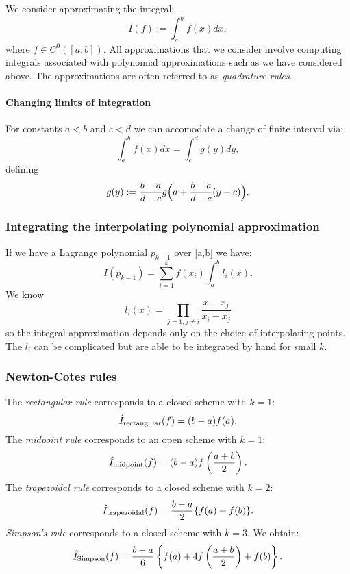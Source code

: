 \documentclass[
]{article}
\begin{document}
We consider approximating the integral: \[I(f) := \int_{a}^{b}f(x)dx, \]
where \(f \in C^{0}([a,b])\). All approximations that we consider
involve computing integrals associated with polynomial approximations
such as we have considered above. The approximations are often referred
to as \emph{quadrature rules}.

\hypertarget{changing-limits-of-integration}{%
\paragraph{Changing limits of
integration}\label{changing-limits-of-integration}}

For constants \(a < b\) and \(c < d\) we can accomodate a change of
finite interval via: \[ \int_{a}^{b}f(x)dx = \int_{c}^{d}g(y)dy, \]
defining
\[g(y) := \frac{b-a}{d-c}g \Big{(}a + \frac{b-a}{d-c}(y-c)\Big{)}. \]

\hypertarget{integrating-the-interpolating-polynomial-approximation}{%
\subsubsection{Integrating the interpolating polynomial
approximation}\label{integrating-the-interpolating-polynomial-approximation}}

If we have a Lagrange polynomial \(p_{k-1}\) over {[}a,b{]} we have:
\[I(p_{k-1}) = \sum_{i=1}^{k}f(x_{i})\int_{a}^{b}l_{i}(x) .\] We know
\[l_{i}(x) = \prod_{j=1,j \neq i}\frac{x - x_{j}}{x_{i} - x_{j}} \] so
the integral approximation depends only on the choice of interpolating
points. The \(l_{i}\) can be complicated but are able to be integrated
by hand for small \(k\).

\hypertarget{newton-cotes-rules}{%
\subsubsection{Newton-Cotes rules}\label{newton-cotes-rules}}

The \emph{rectangular rule} corresponds to a closed scheme with
\(k = 1\): \[\hat{I}_{\rm rectangular}(f) = (b-a) f(a). \] The
\emph{midpoint rule} corresponds to an open scheme with \(k=1\):
\[\hat{I}_{\rm midpoint}(f) = (b-a) f \left ( \frac{a+b}{2} \right). \]
The \emph{trapezoidal rule} corresponds to a closed scheme with \(k=2\):
\[\hat{I}_{\rm trapezoidal}(f) = \frac{b-a}{2} \{ f(a)+f(b) \}. \]
\emph{Simpson's rule} corresponds to a closed scheme with \(k=3\). We
obtain:
\[\hat{I}_{\rm Simpson}(f) = \frac{b-a}{6} \left \{ f(a) + 4 f \left ( \frac{a+b}{2} \right) + f(b) \right \}. \]
\end{document}
